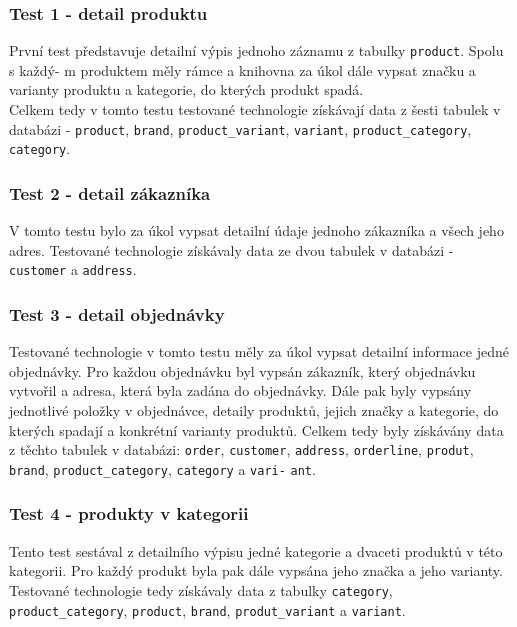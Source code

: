 \documentclass[ing,male,java,dept456]{diploma}						%
\begin{document}
\subsubsection{Test 1 - detail produktu}
První test představuje detailní výpis jednoho záznamu z tabulky \lstinline[style=inlinepython]|product|. Spolu s každý- m produktem měly rámce a knihovna za úkol dále vypsat značku a varianty produktu a kategorie, do kterých produkt spadá. \\
Celkem tedy v tomto testu testované technologie získávají data z šesti tabulek v databázi - \lstinline[style=inlinepython]|product|, \lstinline[style=inlinepython]|brand|, \lstinline[style=inlinepython]|product_variant|, \lstinline[style=inlinepython]|variant|, \lstinline[style=inlinepython]|product_category|, \lstinline[style=inlinepython]|category|.

\subsubsection{Test 2 - detail zákazníka}
V tomto testu bylo za úkol vypsat detailní údaje jednoho zákazníka a všech jeho adres. Testované technologie získávaly data ze dvou tabulek v databázi - \lstinline[style=inlinepython]|customer| a \lstinline[style=inlinepython]|address|.

\subsubsection{Test 3 - detail objednávky}
Testované technologie v tomto testu měly za úkol vypsat detailní informace jedné objednávky. Pro každou objednávku byl vypsán zákazník, který objednávku vytvořil a adresa, která byla zadána do objednávky. Dále pak byly vypsány jednotlivé položky v objednávce, detaily produktů, jejich značky a kategorie, do kterých spadají a konkrétní varianty produktů.
Celkem tedy byly získávány data z těchto tabulek v databázi: \lstinline[style=inlinepython]|order|, \lstinline[style=inlinepython]|customer|, \lstinline[style=inlinepython]|address|, \lstinline[style=inlinepython]|orderline|, \lstinline[style=inlinepython]|produt|, \lstinline[style=inlinepython]|brand|, \lstinline[style=inlinepython]|product_category|, \lstinline[style=inlinepython]|category| a \lstinline[style=inlinepython]|vari-| \lstinline[style=inlinepython]|ant|.

\subsubsection{Test 4 - produkty v kategorii}
Tento test sestával z detailního výpisu jedné kategorie a dvaceti produktů v této kategorii. Pro každý produkt byla pak dále vypsána jeho značka a jeho varianty. \\
Testované technologie tedy získávaly data z tabulky \lstinline[style=inlinepython]|category|, \lstinline[style=inlinepython]|product_category|, \lstinline[style=inlinepython]|product|, \lstinline[style=inlinepython]|brand|, \lstinline[style=inlinepython]|produt_variant| a \lstinline[style=inlinepython]|variant|.
\end{document}
